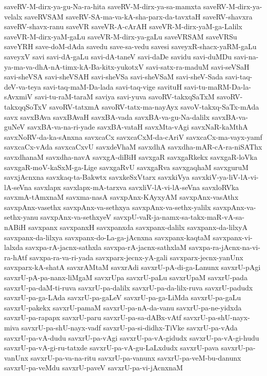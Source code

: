 {saveRV-M-dirx-ya-gu-Na-ra-hita
saveRV-M-dirx-ya-sa-mamxta
saveRV-M-dirx-ya-velalx
saveRVSAM
saveRV-SA-ma-va-kA-sha-parx-da-tavxtaH
saveRV-shavxra
saveRV-shavx-ranu
saveVR
saveVR-A-cArAH
saveVR-M-dirx-yaM-ga-Lalilx
saveVR-M-dirx-yaM-gaLu
saveVR-M-dirx-ya-gaLu
saveVRSAM
saveVRSu
saveYRH
save-doM-dAda
savedu
save-sa-vedu
savesi
saveyxR-shacx-yaRM-gaLu
saveyxV
savi
savi-dA-gaLu
savi-dA-taneV
savi-daDe
savidu
savi-duMDu
savi-na-ya-ma-va-dhA-nA-timx-kA-Ba-kitx-yukotxV
savi-satx-ra-maduM
savi-seVSaH
savi-sheVSA
savi-sheVSAH
savi-sheVSa
savi-sheVSaM
savi-sheV-Sada
savi-taq-deV-va-teya
savi-taq-maM-Da-lada
savi-taq-vige
savituH
savi-tu-maRM-Da-la-sAvxmiV
savi-tu-raM-taraM
saviya
savi-yuva
savoRV-takxqSaTxM
savoRV-takxqqSoTxV
savoRV-tatxmA
savoRV-tatx-ma-nayAyx
savoV-takxq-SaTx-mAda
savx
savxBAva
savxBAvaH
savxBA-vada
savxBA-va-gu-Na-dalilx
savxBA-va-guNeV
savxBA-va-na-ri-yade
savxBA-vataH
savxMta-vAgi
savxNaR-kaMthA
savxNoRV-da-ka-sAnxna
savxcaCx
savxcaCxM-da-cAriV
savxcaCx-ma-vayx-yamf
savxcaCx-vAda
savxcaCxvU
savxdeVhaM
savxdhA
savxdha-mAR-cA-ra-niSAThx
savxdhanaM
savxdha-navA
savxgA-diBiH
savxgaR
savxgaRkekx
savxgaR-loVka
savxgaR-moV-kaSxM-ga-Lige
savxgaRvU
savxgaRva
savxgaqhaM
savxguruM
savxjAcnxna
savxkaq-ta-Bakwtx
savxkeSxVtarx
savxkiVya
savxkiV-ya-liV-lA-vi-lA-seVna
savxlapx
savxlapx-mA-tarxva
savxliV-lA-vi-lA-seVna
savxloRVka
savxmA-tAmxnaM
savxma-nasA
savxpAnx-KAyxyAM
savxpAnx-vasAthx
savxpAnx-vasethx
savxpAnx-va-sethxya
savxpAnx-va-sethx-yalilx
savxpAnx-va-sethx-yanu
savxpAnx-va-sethxyeV
savxpU-vaR-ja-namx-sa-takx-maR-vA-sa-nABiH
savxpanx
savxpanxH
savxpanxda
savxpanx-dalilx
savxpanx-da-lilxyA
savxpanx-da-lilxya
savxpanx-do-La-ga-jAcnxna
savxpanx-kaqtaM
savxpanx-vi-lalxda
savxpa-rA-jacnx-sathxla
savxpa-rA-jacnx-sathxlaM
savxpa-ra-jAcnx-na-vi-ra-hAtf
savxpa-ra-va-ri-yada
savxparx-jecnx-yA-gali
savxparx-jecnx-yanUnx
savxparx-kA-shatA
savxrAMtaM
savxrAdi
savxrU-pA-di-ga-Lanunx
savxrU-pAgi
savxrU-pA-pa-nanx-liMgaM
savxrUpa
savxrU-paLu
savxrUpaM
savxrU-pada
savxrU-pa-daM-ti-ruva
savxrU-pa-dalilx
savxrU-pa-da-lilx-ruva
savxrU-padudx
savxrU-pa-ga-LAda
savxrU-pa-gaLeV
savxrU-pa-ga-LiMda
savxrU-pa-gaLu
savxrU-pakekx
savxrU-pamaM
savxrU-pa-nA-da-vanu
savxrU-pa-ne-yidxda
savxrU-pa-rapapx
savxrU-paru
savxrU-pa-sa-dABx-vAtf
savxrU-pa-shU-nayx-miva
savxrU-pa-shU-nayx-vadf
savxrU-pa-si-didhx-TiVke
savxrU-pa-vAda
savxrU-pa-vA-dudu
savxrU-pa-vAgi
savxrU-pa-vA-gidudx
savxrU-pa-vA-gi-hudu
savxrU-pa-vA-gi-ru-tatxde
savxrU-pa-vA-gu-LaLxdudx
savxrU-pava
savxrU-pa-vanUnx
savxrU-pa-va-na-ritu
savxrU-pa-vanunx
savxrU-pa-veM-bu-danunx
savxrU-pa-veMdu
savxrU-paveV
savxrU-pa-vi-jAcnxnaM
}
